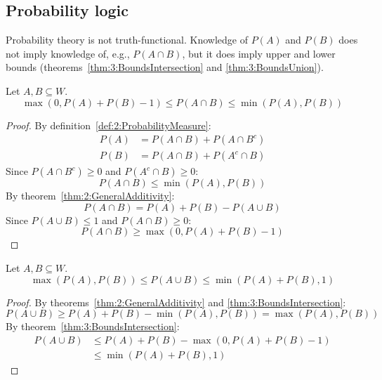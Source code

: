 
\subsection{Probability logic}

Probability theory is not truth-functional.
Knowledge of $P(A)$ and $P(B)$ does not imply knowledge of, e.g., $P(A \cap
  B)$, but it does imply upper and lower bounds
(theorems~\ref{thm:3:BoundsIntersection} and \ref{thm:3:BoundsUnion}).

\begin{thm}
  \label{thm:3:BoundsIntersection}
  Let $A, B \subseteq W$.
  \begin{equation}
    \label{eqn:3:BoundsIntersection}
    \max(0, P(A) + P(B) - 1) \leq P(A \cap B) \leq \min(P(A), P(B))
  \end{equation}
  \begin{proof}
    By definition~\ref{def:2:ProbabilityMeasure}:
    \begin{align}
      P(A) & = P(A \cap B) + P(A \cap B^c) \label{eqn:3:BoundsIntersection1}
      \\
      P(B) & = P(A \cap B) + P(A^c \cap B) \label{eqn:3:BoundsIntersection2}
    \end{align}
    Since $P(A \cap B^c) \geq 0$ and $P(A^c \cap B) \geq 0$:
    \begin{equation}
      P(A \cap B) \leq \min(P(A), P(B)) \label{eqn:3:BoundsIntersection3}
    \end{equation}
    By theorem~\ref{thm:2:GeneralAdditivity}:
    \begin{equation}
      P(A \cap B) = P(A) + P(B) - P(A \cup B) \label{eqn:3:BoundsIntersection4}
    \end{equation}
    Since $P(A \cup B) \leq 1$ and $P(A \cap B) \geq 0$:
    \begin{equation}
      P(A \cap B) \geq \max(0, P(A) + P(B) - 1) \label{eqn:3:BoundsIntersection5}
    \end{equation}
  \end{proof}
\end{thm}

\begin{thm}
  \label{thm:3:BoundsUnion}
  Let $A, B \subseteq W$.
  \begin{equation}
    \max(P(A), P(B)) \leq P(A \cup B) \leq \min(P(A) + P(B), 1)
  \end{equation}
  \begin{proof}
    By theorems~\ref{thm:2:GeneralAdditivity} and \ref{thm:3:BoundsIntersection}:
    \begin{equation}
      P(A \cup B) \geq P(A) + P(B) - \min(P(A), P(B)) = \max(P(A), P(B))
      \label{eqn:3:BoundsUnion1}
    \end{equation}
    By theorem~\ref{thm:3:BoundsIntersection}:
    \begin{align}
      P(A \cup B) & \leq P(A) + P(B) - \max(0, P(A) + P(B) - 1)
      \\
                  & \leq \min(P(A) +
      P(B), 1) \label{eqn:3:BoundsUnion3}
    \end{align}
  \end{proof}
\end{thm}

